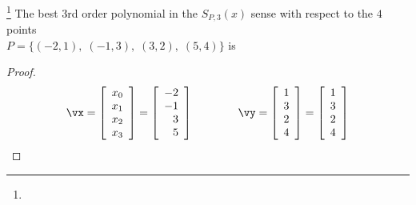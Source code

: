 \begin{example}
\footnote{
  }
\label{ex:ls}
The best 3rd order polynomial in the  $S_{P,3}(x)$ sense
with respect to the $4$ points\\
$P=\{(-2,1),\; (-1,3),\; (3,2),\; (5,4)\}$ is
\end{example}
\begin{proof}
\[
  \vx
    =
    \left[\begin{array}{l}
       x_0  \\
       x_1  \\
       x_2  \\
       x_3  
    \end{array}\right] 
    =
    \left[\begin{array}{r}
       -2   \\
       -1   \\
        3   \\
        5   
    \end{array}\right] 
   \qquad\qquad
   \vy 
     =
     \left[\begin{array}{r}
         1   \\
         3   \\
         2   \\
         4   \\
     \end{array}\right] 
     =
     \left[\begin{array}{l}
         1   \\
         3   \\
         2   \\
         4   \\
     \end{array}\right] 
\]


\end{proof}
